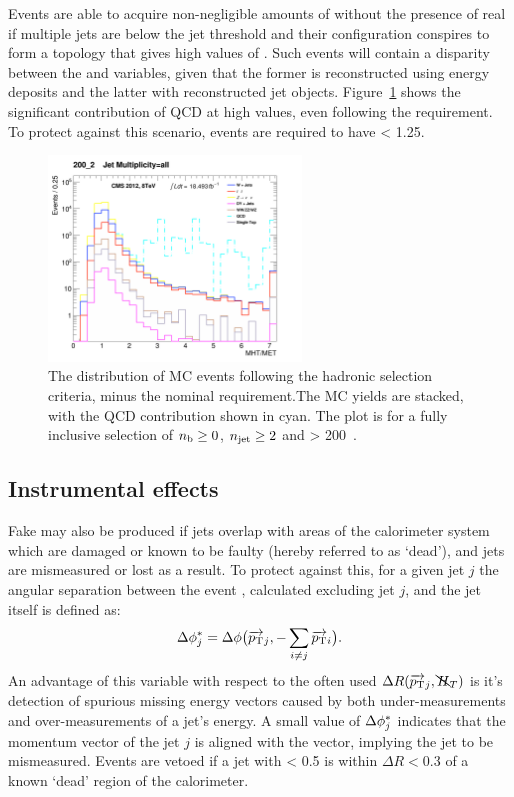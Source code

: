 Events are able to acquire non-negligible amounts of \mht without the presence
of
real \met if multiple jets are below the jet \Pt threshold and their
configuration conspires to form a topology that gives high values of \alphat.
Such events will contain a disparity between the \met and
\mht variables, given that the former is reconstructed using energy deposits
and the latter with reconstructed jet objects.
Figure~\ref{fig:full_mhtmet_distro} shows the significant contribution of QCD at
high \mhtmet values, even following the \alphat requirement.
To protect against this scenario, events are required to have \mhtmet < 1.25.

\begin{figure}[t]
\centering
\includegraphics[width=0.6\textwidth]
{Figs/datamc/had/v1/Stacked_MHTovMET_all_200_upwards.png}
\caption{The \mhtmet distribution of MC events following the hadronic selection
criteria, minus the nominal \mhtmet requirement.The MC yields are stacked,
with the QCD contribution shown in cyan. The plot is for a fully inclusive
selection of $n_{\text{b}} \geq 0$, $n_{\text{jet}} \geq 2$ and \HT > 200~\gev.}
\label{fig:full_mhtmet_distro}
\end{figure}

\subsection{Instrumental effects}

Fake \mht may also be produced if jets overlap with areas of the calorimeter 
system which are damaged or known to be faulty (hereby referred to as `dead'),
and jets are mismeasured or lost as a result. To protect against this, for a
given jet $j$ the angular separation between the event \mht, calculated
excluding jet $j$, and the jet itself is defined as:
% 
\begin{equation}
\Delta \phi^*_j = \Delta \phi\big(\overrightarrow{{p_{\text T}}}_j,-\sum_{i\neq j}
{\overrightarrow{{p_{\text T}}}_i}\big) .
\label{eq:biasdphi}
\end{equation}
% 
An advantage of this variable with respect to the often used
$\Delta R(\overrightarrow{{p_{\text T}}}_j, \bcancel{H}_T)$ is it's detection of spurious missing
energy vectors
caused
by both under-measurements and over-measurements of a jet's energy.
A small value of $\Delta \phi^*_j$ indicates that the momentum vector of the jet $j$
is aligned with the \mht vector, implying the jet to be mismeasured. Events are
vetoed if a jet with \dphistar< 0.5 is within $\Delta R < 0.3$ of a known
`dead' region of the calorimeter.

